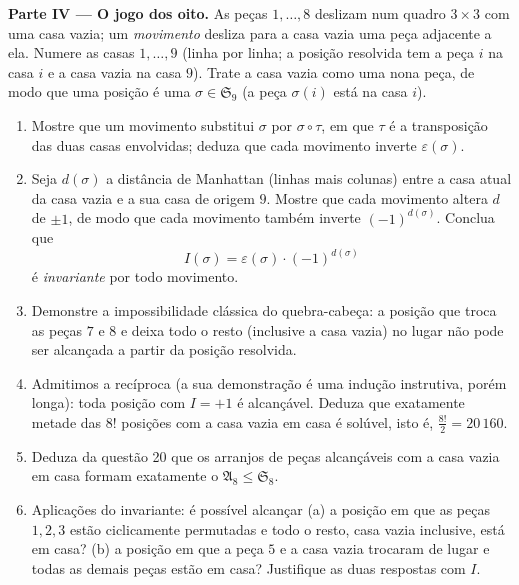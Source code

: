 \begin{problem}
\medskip
\noindent\textbf{Parte IV --- O jogo dos oito.} As peças $1, \dots, 8$
deslizam num quadro $3 \times 3$ com uma casa vazia; um \emph{movimento}
desliza para a casa vazia uma peça adjacente a ela. Numere as casas
$1, \dots, 9$ (linha por linha; a posição resolvida tem a peça $i$ na
casa $i$ e a casa vazia na casa $9$). Trate a casa vazia como
uma nona peça, de modo que uma posição é uma  $\sigma \in \mathfrak
S_9$ (a peça $\sigma(i)$ está na casa $i$).
\begin{enumerate}
  \item Mostre que um movimento substitui $\sigma$ por $\sigma \circ \tau$,
        em que $\tau$ é a transposição das duas casas
        envolvidas; deduza que cada movimento inverte
        $\varepsilon(\sigma)$.
  \item Seja $d(\sigma)$ a distância de Manhattan (linhas mais
        colunas) entre a casa atual da casa vazia e a sua
        casa de origem $9$. Mostre que cada movimento altera $d$ de $\pm1$,
        de modo que cada movimento também inverte $(-1)^{d(\sigma)}$. Conclua que
        \[
        I(\sigma) = \varepsilon(\sigma)\cdot(-1)^{d(\sigma)}
        \]
        é \emph{invariante} por todo movimento.
  \item Demonstre a impossibilidade clássica do quebra-cabeça: a posição
        que troca as peças $7$ e $8$ e deixa todo o resto
        (inclusive a casa vazia) no lugar não pode ser alcançada
        a partir da posição resolvida.
  \item Admitimos a recíproca (a sua demonstração é uma indução
        instrutiva, porém longa): toda posição com $I = +1$ é
        alcançável. Deduza que exatamente metade das $8!$ posições
        com a casa vazia em casa é solúvel, isto é,
        $\frac{8!}2 = 20\,160$.
  \item Deduza da questão 20 que os arranjos de peças alcançáveis
        com a casa vazia em casa formam exatamente o
         $\mathfrak A_8 \leq \mathfrak S_8$.
  \item Aplicações do invariante: é possível alcançar (a) a
        posição em que as peças $1, 2, 3$ estão ciclicamente
        permutadas e todo o resto, casa vazia inclusive, está em casa?
        (b) a posição em que a peça $5$ e a casa vazia
        trocaram de lugar e todas as demais peças estão em casa? Justifique
        as duas respostas com $I$.
\end{enumerate}


\end{problem}
